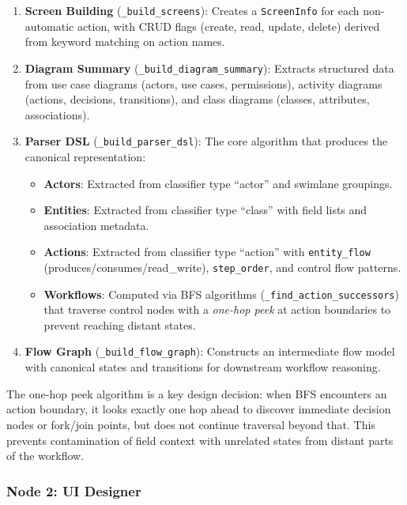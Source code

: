 \begin{enumerate}
    \item \textbf{Screen Building} (\texttt{\_build\_screens}): Creates a \texttt{ScreenInfo} for each non-automatic action, with CRUD flags (create, read, update, delete) derived from keyword matching on action names.
    
    \item \textbf{Diagram Summary} (\texttt{\_build\_diagram\_summary}): Extracts structured data from use case diagrams (actors, use cases, permissions), activity diagrams (actions, decisions, transitions), and class diagrams (classes, attributes, associations).
    
    \item \textbf{Parser DSL} (\texttt{\_build\_parser\_dsl}): The core algorithm that produces the canonical representation:
    \begin{itemize}
        \item \textbf{Actors}: Extracted from classifier type ``actor'' and swimlane groupings.
        \item \textbf{Entities}: Extracted from classifier type ``class'' with field lists and association metadata.
        \item \textbf{Actions}: Extracted from classifier type ``action'' with \texttt{entity\_flow} (produces/consumes/read\_write), \texttt{step\_order}, and control flow patterns.
        \item \textbf{Workflows}: Computed via BFS algorithms (\texttt{\_find\_action\_successors}) that traverse control nodes with a \emph{one-hop peek} at action boundaries to prevent reaching distant states.
    \end{itemize}
    
    \item \textbf{Flow Graph} (\texttt{\_build\_flow\_graph}): Constructs an intermediate flow model with canonical states and transitions for downstream workflow reasoning.
\end{enumerate}

The one-hop peek algorithm is a key design decision: when BFS encounters an action boundary, it looks exactly one hop ahead to discover immediate decision nodes or fork/join points, but does not continue traversal beyond that. This prevents contamination of field context with unrelated states from distant parts of the workflow.


\subsubsection{Node 2: UI Designer}

